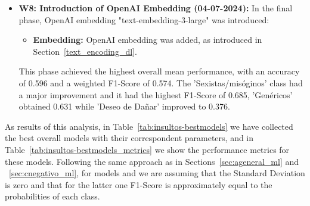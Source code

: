 \begin{itemize}
    \item \textbf{W8: Introduction of OpenAI Embedding (04-07-2024):} In the final phase, OpenAI embedding "text-embedding-3-large" was introduced:
        \begin{itemize}
            \item \textbf{Embedding:} OpenAI embedding was added, as introduced in Section~\ref{text_encoding_dl}.
        \end{itemize}
    This phase achieved the highest overall mean performance, with an accuracy of 0.596 and a weighted F1-Score of 0.574. The 'Sexistas/misóginos' class had a major improvement and it had the highest F1-Score of 0.685, 'Genéricos' obtained 0.631 while 'Deseo de Dañar' improved to 0.376.
    
    
\end{itemize}



As results of this analysis, in Table~\ref{tab:insultos-bestmodels} we have collected the best overall models with their correspondent parameters, and in Table~\ref{tab:insultos-bestmodels_metrics} we show the performance metrics for these models. Following the same approach as in Sections~\ref{sec:ageneral_ml} and ~\ref{sec:cnegativo_ml}, for models {\insmajor} and {\insrandom} we are assuming that the Standard Deviation is zero and that for the latter one F1-Score is approximately equal to the probabilities of each class.

